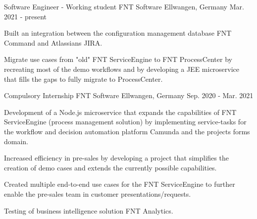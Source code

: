 

\begin{cventries}

\cventry
    {Software Engineer - Working student} %
    {FNT Software} %
    {Ellwangen, Germany} %
    {Mar. 2021 - present} %
    {
      \begin{cvitems} %
        \item {Built an integration between the configuration management database FNT Command and Atlassians JIRA.}
        \item {Migrate use cases from "old" FNT ServiceEngine to FNT ProcessCenter by recreating most of the demo workflows and by developing a JEE microservice that fills the gaps to fully migrate to ProcessCenter.}
      \end{cvitems}
    }

  \cventry
    {Compulsory Internship} %
    {FNT Software} %
    {Ellwangen, Germany} %
    {Sep. 2020 - Mar. 2021} %
    {
      \begin{cvitems} %
        \item {Development of a Node.js microservice that expands the capabilities of FNT ServiceEngine (process management solution) by implementing service-tasks for the workflow and decision automation platform Camunda and the projects forms domain.}
        \item {Increased efficiency in pre-sales by developing a project that simplifies the creation of demo cases and extends the currently possible capabilities.}
        \item {Created multiple end-to-end use cases for the FNT ServiceEngine to further enable the pre-sales team in customer presentations/requests.}
        \item {Testing of business intelligence solution FNT Analytics.}
      \end{cvitems}
    }


\end{cventries}
